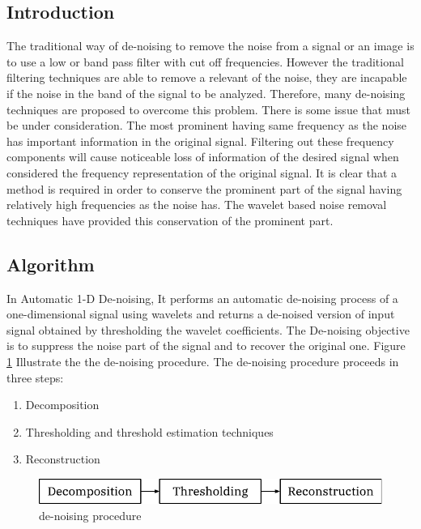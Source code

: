 \documentclass[12pt, a4paper, twoside]{report}
\begin{document}
\subsection{Introduction}
The traditional way of de-noising to remove the noise from a signal or an image is to use a low or band pass filter with cut off frequencies. However the traditional filtering techniques are able to remove a relevant of the noise, they are incapable if the noise in the band of the signal to be analyzed. Therefore, many de-noising techniques are proposed to overcome this problem.
 There is some issue that must be under consideration. The most prominent having same frequency as the noise has important information in the original signal. Filtering out these frequency components will cause noticeable loss of information of the desired signal when considered the frequency representation of the original signal. It is clear that a method is required in order to conserve the prominent part of the signal having relatively high frequencies as the noise has. The wavelet based noise removal techniques have provided this conservation of the prominent part.

\subsection{Algorithm}
In Automatic 1-D De-noising, It performs an automatic 
de-noising process of a one-dimensional  signal  using wavelets  and  returns  a  de-noised  version of  input  signal  obtained  by  thresholding the  wavelet  coefficients.  The  De-noising objective  is  to  suppress  the  noise  part  of the  signal  and  to  recover  the  original one. Figure \ref{fig:denoise-proc} Illustrate the the de-noising procedure. The de-noising procedure proceeds in three steps:
\begin{enumerate}[label=\Roman*., noitemsep]
\item Decomposition
\item Thresholding and threshold estimation techniques 
\item Reconstruction
\end{enumerate}
\begin{figure}[!h]
	\centering
	\includegraphics[]
	{images/chapter3/denoise-proc}
	\caption{de-noising procedure}
	\label{fig:denoise-proc}
\end{figure}
\end{document}

